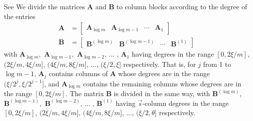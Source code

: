 \begin{pf}
See We divide the matrices $\mathbf{A}$ and $\mathbf{B}$ to column
blocks according to the degree of the entries 
\begin{align*}
\mathbf{A} & =\left[\begin{array}{cccc}
\mathbf{A}_{\log m} & \mathbf{A}_{\log m-1} & \cdots & \mathbf{A}_{1}\end{array}\right]\\
\mathbf{B} & =\left[\begin{array}{cccc}
\mathbf{B}^{\left(\log m\right)} & \mathbf{B}^{\left(\log m-1\right)} & \cdots & \mathbf{B}^{\left(1\right)}\end{array}\right]
\end{align*}
with $\mathbf{A}_{\log m},$ $\mathbf{A}_{\log m-1},$ $\mathbf{A}_{\log m-2}$,
... , $\mathbf{A}_{1}$ having degrees in the range $\left[0,2\xi/m\right]$,
$(2\xi/m,4\xi/m]$, $(4\xi/m,8\xi/m]$, ..., $(\xi/2,\xi]$ respectively.
That is, for $j$ from 1 to $\log m-1$, $\mathbf{A}_{j}$ contains
columns of $\mathbf{A}$ whose degrees are in the range $(\xi/2^{j},\xi/2^{j-1}]$,
and $\mathbf{A}_{\log m}$ contains the remaining columns whose degrees
are in the range $\left[0,2\xi/m\right]$. The matrix $\mathbf{B}$
is divided in the same way, with $\mathbf{B}^{\left(\log m\right)}$,
$\mathbf{B}^{\left(\log m-1\right)},$ $\mathbf{B}^{\left(\log m-2\right)}$,
... , $\mathbf{B}^{\left(1\right)}$ having $\vec{s}$-column degrees
in the range $\left[0,2\xi/m\right]$, $(2\xi/m,4\xi/m]$, $(4\xi/m,8\xi/m]$,
..., $(\xi/2,\theta]$ respectively.


\end{pf}
